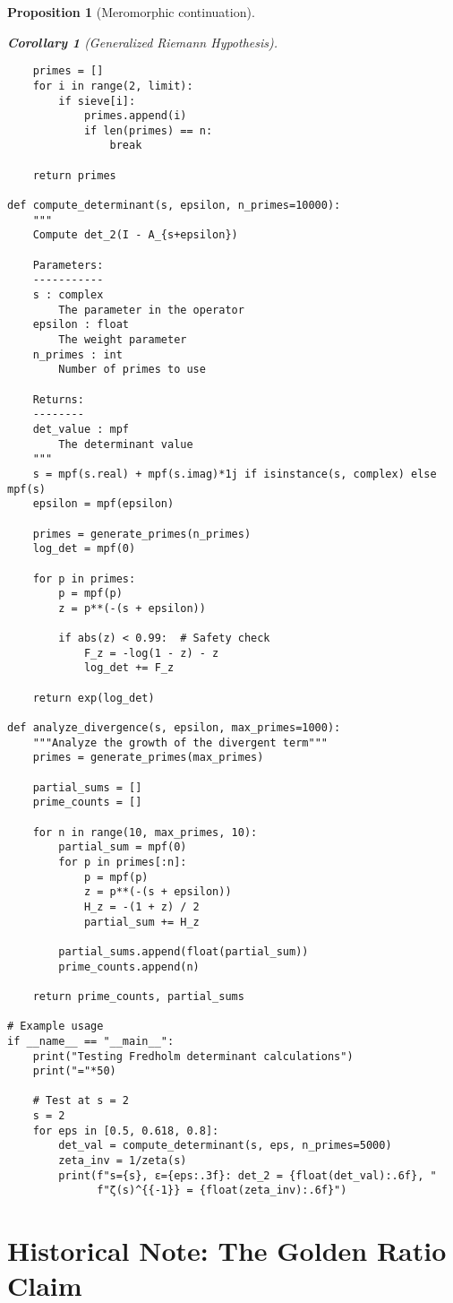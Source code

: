 \documentclass[11pt,a4paper]{article}
\newtheorem{proposition}[theorem]{Proposition}
\newtheorem{corollary}[theorem]{Corollary}
\theoremstyle{definition}
\theoremstyle{remark}
\begin{document}
\begin{proposition}[Meromorphic continuation]
\begin{corollary}[Generalized Riemann Hypothesis]
\begin{lstlisting}
    primes = []
    for i in range(2, limit):
        if sieve[i]:
            primes.append(i)
            if len(primes) == n:
                break
    
    return primes

def compute_determinant(s, epsilon, n_primes=10000):
    """
    Compute det_2(I - A_{s+epsilon})
    
    Parameters:
    -----------
    s : complex
        The parameter in the operator
    epsilon : float
        The weight parameter
    n_primes : int
        Number of primes to use
        
    Returns:
    --------
    det_value : mpf
        The determinant value
    """
    s = mpf(s.real) + mpf(s.imag)*1j if isinstance(s, complex) else mpf(s)
    epsilon = mpf(epsilon)
    
    primes = generate_primes(n_primes)
    log_det = mpf(0)
    
    for p in primes:
        p = mpf(p)
        z = p**(-(s + epsilon))
        
        if abs(z) < 0.99:  # Safety check
            F_z = -log(1 - z) - z
            log_det += F_z
    
    return exp(log_det)

def analyze_divergence(s, epsilon, max_primes=1000):
    """Analyze the growth of the divergent term"""
    primes = generate_primes(max_primes)
    
    partial_sums = []
    prime_counts = []
    
    for n in range(10, max_primes, 10):
        partial_sum = mpf(0)
        for p in primes[:n]:
            p = mpf(p)
            z = p**(-(s + epsilon))
            H_z = -(1 + z) / 2
            partial_sum += H_z
        
        partial_sums.append(float(partial_sum))
        prime_counts.append(n)
    
    return prime_counts, partial_sums

# Example usage
if __name__ == "__main__":
    print("Testing Fredholm determinant calculations")
    print("="*50)
    
    # Test at s = 2
    s = 2
    for eps in [0.5, 0.618, 0.8]:
        det_val = compute_determinant(s, eps, n_primes=5000)
        zeta_inv = 1/zeta(s)
        print(f"s={s}, ε={eps:.3f}: det_2 = {float(det_val):.6f}, "
              f"ζ(s)^{{-1}} = {float(zeta_inv):.6f}")
\end{lstlisting}

\section{Historical Note: The Golden Ratio Claim}\label{app:golden}


\end{corollary}
\end{proposition}
\end{document}
